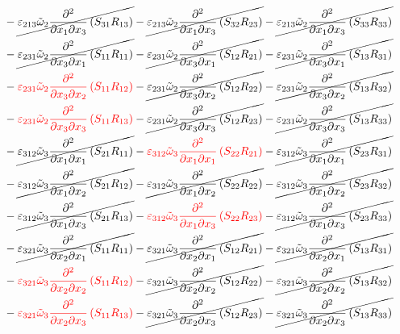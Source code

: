 \begin{equation}
\begin{split}
&		-\cancel{\varepsilon_{213}\tilde{\omega}_{2}\pdv{}{x_{1}}{x_{3}}\left(S_{31}R_{13}\right)}
		-\cancel{\varepsilon_{213}\tilde{\omega}_{2}\pdv{}{x_{1}}{x_{3}}\left(S_{32}R_{23}\right)}
		-\cancel{\varepsilon_{213}\tilde{\omega}_{2}\pdv{}{x_{1}}{x_{3}}\left(S_{33}R_{33}\right)}\\
&		-\cancel{\varepsilon_{231}\tilde{\omega}_{2}\pdv{}{x_{3}}{x_{1}}\left(S_{11}R_{11}\right)}
		-\cancel{\varepsilon_{231}\tilde{\omega}_{2}\pdv{}{x_{3}}{x_{1}}\left(S_{12}R_{21}\right)}
		-\cancel{\varepsilon_{231}\tilde{\omega}_{2}\pdv{}{x_{3}}{x_{1}}\left(S_{13}R_{31}\right)}\\
&		-{\color{red}\varepsilon_{231}\tilde{\omega}_{2}\pdv{}{x_{3}}{x_{2}}\left(S_{11}R_{12}\right)}
		-\cancel{\varepsilon_{231}\tilde{\omega}_{2}\pdv{}{x_{3}}{x_{2}}\left(S_{12}R_{22}\right)}
		-\cancel{\varepsilon_{231}\tilde{\omega}_{2}\pdv{}{x_{3}}{x_{2}}\left(S_{13}R_{32}\right)}\\
&		-{\color{red}\varepsilon_{231}\tilde{\omega}_{2}\pdv{}{x_{3}}{x_{3}}\left(S_{11}R_{13}\right)}
		-\cancel{\varepsilon_{231}\tilde{\omega}_{2}\pdv{}{x_{3}}{x_{3}}\left(S_{12}R_{23}\right)}
		-\cancel{\varepsilon_{231}\tilde{\omega}_{2}\pdv{}{x_{3}}{x_{3}}\left(S_{13}R_{33}\right)}\\
&		-\cancel{\varepsilon_{312}\tilde{\omega}_{3}\pdv{}{x_{1}}{x_{1}}\left(S_{21}R_{11}\right)}
		-{\color{red}\varepsilon_{312}\tilde{\omega}_{3}\pdv{}{x_{1}}{x_{1}}\left(S_{22}R_{21}\right)}
		-\cancel{\varepsilon_{312}\tilde{\omega}_{3}\pdv{}{x_{1}}{x_{1}}\left(S_{23}R_{31}\right)}\\
&		-\cancel{\varepsilon_{312}\tilde{\omega}_{3}\pdv{}{x_{1}}{x_{2}}\left(S_{21}R_{12}\right)}
		-\cancel{\varepsilon_{312}\tilde{\omega}_{3}\pdv{}{x_{1}}{x_{2}}\left(S_{22}R_{22}\right)}
		-\cancel{\varepsilon_{312}\tilde{\omega}_{3}\pdv{}{x_{1}}{x_{2}}\left(S_{23}R_{32}\right)}\\
&		-\cancel{\varepsilon_{312}\tilde{\omega}_{3}\pdv{}{x_{1}}{x_{3}}\left(S_{21}R_{13}\right)}
		-{\color{red}\varepsilon_{312}\tilde{\omega}_{3}\pdv{}{x_{1}}{x_{3}}\left(S_{22}R_{23}\right)}
		-\cancel{\varepsilon_{312}\tilde{\omega}_{3}\pdv{}{x_{1}}{x_{3}}\left(S_{23}R_{33}\right)}\\
&		-\cancel{\varepsilon_{321}\tilde{\omega}_{3}\pdv{}{x_{2}}{x_{1}}\left(S_{11}R_{11}\right)}
		-\cancel{\varepsilon_{321}\tilde{\omega}_{3}\pdv{}{x_{2}}{x_{1}}\left(S_{12}R_{21}\right)}
		-\cancel{\varepsilon_{321}\tilde{\omega}_{3}\pdv{}{x_{2}}{x_{1}}\left(S_{13}R_{31}\right)}\\
&		-{\color{red}\varepsilon_{321}\tilde{\omega}_{3}\pdv{}{x_{2}}{x_{2}}\left(S_{11}R_{12}\right)}
		-\cancel{\varepsilon_{321}\tilde{\omega}_{3}\pdv{}{x_{2}}{x_{2}}\left(S_{12}R_{22}\right)}
		-\cancel{\varepsilon_{321}\tilde{\omega}_{3}\pdv{}{x_{2}}{x_{2}}\left(S_{13}R_{32}\right)}\\
&		-{\color{red}\varepsilon_{321}\tilde{\omega}_{3}\pdv{}{x_{2}}{x_{3}}\left(S_{11}R_{13}\right)}
		-\cancel{\varepsilon_{321}\tilde{\omega}_{3}\pdv{}{x_{2}}{x_{3}}\left(S_{12}R_{23}\right)}
		-\cancel{\varepsilon_{321}\tilde{\omega}_{3}\pdv{}{x_{2}}{x_{3}}\left(S_{13}R_{33}\right)}\\
	\end{split}
\end{equation}
